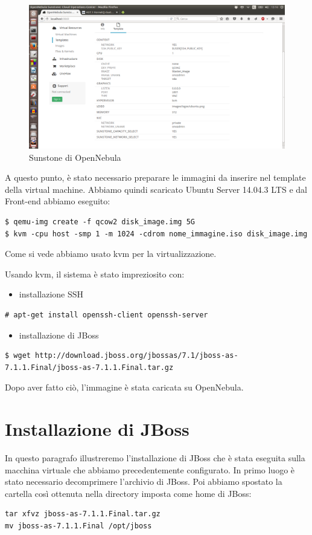 \documentclass[twoside]{article}
\begin{document}
\begin{figure}[!bp]
\centering
\includegraphics[width=13cm]{immagine3.png}
\caption{Sunstone di OpenNebula}\label{fig:3}
\end{figure}


A questo punto, è stato necessario preparare le immagini da inserire nel template della virtual machine.
Abbiamo quindi scaricato Ubuntu Server 14.04.3 LTS e dal Front-end abbiamo eseguito:
\begin{lstlisting}[frame=trBL]
$ qemu-img create -f qcow2 disk_image.img 5G
$ kvm -cpu host -smp 1 -m 1024 -cdrom nome_immagine.iso disk_image.img
\end{lstlisting}
Come si vede abbiamo usato kvm \cite{bib:kvm} per la virtualizzazione.

Usando kvm, il sistema è stato impreziosito con:
\begin{itemize}
	\item installazione SSH
\end{itemize}
\begin{lstlisting}[frame=trBL]
# apt-get install openssh-client openssh-server
\end{lstlisting}
\begin{itemize}
\item installazione di JBoss
\end{itemize}		  
\begin{lstlisting}[frame=trBL]
$ wget http://download.jboss.org/jbossas/7.1/jboss-as-7.1.1.Final/jboss-as-7.1.1.Final.tar.gz		  
\end{lstlisting}
Dopo aver fatto ciò, l'immagine è stata caricata su OpenNebula.

\section{Installazione di JBoss}
In questo paragrafo illustreremo l'installazione di JBoss \cite{bib:jboss}
che è stata eseguita sulla macchina virtuale che abbiamo precedentemente configurato. 
In primo luogo è stato necessario decomprimere l'archivio di JBoss.
Poi abbiamo spostato la cartella così ottenuta nella directory imposta come home di JBoss:
\begin{lstlisting}[frame=trBL]
tar xfvz jboss-as-7.1.1.Final.tar.gz
mv jboss-as-7.1.1.Final /opt/jboss
\end{lstlisting}
\end{document}

